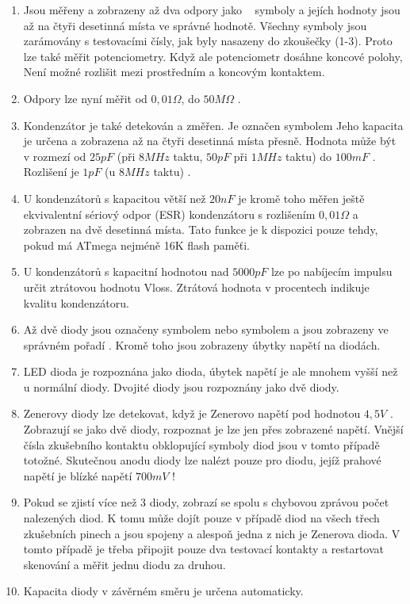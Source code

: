 \begin{enumerate}
\item Jsou měřeny a zobrazeny až dva odpory jako \mbox{~\electricR} symboly a jejích hodnoty jsou až na čtyři desetinná místa ve správné hodnotě.
Všechny symboly jsou zarámovány s testovacími čísly, jak byly nasazeny do zkoušečky (1-3).
Proto lze také měřit potenciometry. Když ale potenciometr dosáhne koncové polohy,
Není možné rozlišit mezi prostředním a koncovým kontaktem.
\item Odpory lze nyní měřit od \(0,01\Omega\), do \(50M\Omega\) .
\item Kondenzátor je také detekován a změřen. Je označen symbolem \mbox{\electricC}
Jeho kapacita je určena a zobrazena až na čtyři desetinná místa přesně.
Hodnota může být v rozmezí od \(25pF\) (při \(8MHz\) taktu, \(50pF\) při \(1MHz\) taktu) do \(100mF\) . Rozlišení je \(1pF\) (u \(8MHz\) taktu) .
\item U kondenzátorů s kapacitou větší než \(20nF\) je kromě toho měřen ještě ekvivalentní sériový odpor (ESR) kondenzátoru
s rozlišením \(0,01\Omega\) a zobrazen na dvě desetinná místa.
Tato funkce je k dispozici pouze tehdy, pokud má ATmega nejméně 16K flash paměťi.
\item U kondenzátorů s kapacitní hodnotou nad \(5000pF\) lze po nabíjecím impulsu určit ztrátovou hodnotu Vloss.
Ztrátová hodnota v procentech indikuje kvalitu kondenzátoru.
\item Až dvě diody jsou označeny symbolem \mbox{\electricDAK} nebo symbolem \mbox{\electricDKA}
a jsou zobrazeny ve správném pořadí .
Kromě toho jsou zobrazeny úbytky napětí na diodách.
\item LED dioda je rozpoznána jako dioda, úbytek napětí je ale mnohem vyšší než u normální diody.
Dvojité diody jsou rozpoznány jako dvě diody.
\item Zenerovy diody lze detekovat, když je Zenerovo napětí pod hodnotou \(4,5V\) .
Zobrazují se jako dvě diody, rozpoznat je lze jen přes zobrazené napětí.
Vnější čísla zkušebního kontaktu obklopující symboly diod jsou v tomto případě totožné.
Skutečnou anodu diody lze nalézt pouze pro diodu, jejíž prahové napětí je blízké napětí \(700mV\) !
\item Pokud se zjistí více než 3 diody, zobrazí se spolu s chybovou zprávou počet nalezených diod.
K tomu může dojít pouze v případě diod na všech třech zkušebních pinech a jsou spojeny a alespoň jedna z nich je Zenerova dioda. V tomto případě je třeba připojit pouze dva testovací kontakty a restartovat skenování a měřit jednu diodu za druhou.
\item Kapacita diody v závěrném směru je určena automaticky.

\end{enumerate}
